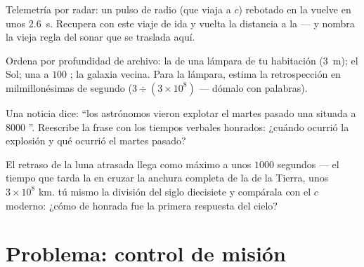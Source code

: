 \begin{exercise}[$\star\star$]\label{exo:g8:speed-of-light:9}
Telemetría por radar: un pulso de radio (que viaja a $c$) rebotado en
la  vuelve en unos \qty{2.6}{s}. Recupera con este viaje de ida
y vuelta la distancia a la  --- y nombra la vieja regla del
sonar que se traslada aquí.
\end{exercise}

\begin{exercise}[$\star\star$]\label{exo:g8:speed-of-light:10}
Ordena por profundidad de archivo: la  de una lámpara de tu
habitación (\qty{3}{m}); el Sol; una  a $100$
; la galaxia vecina. Para la lámpara, estima la
retrospección en milmillonésimas de segundo ($3 \div (3 \times
10^{8})$ --- dómalo con palabras).
\end{exercise}

\begin{exercise}[$\star\star$]\label{exo:g8:speed-of-light:11}
Una noticia dice: ``los astrónomos vieron explotar el martes pasado una
 situada a $8000$ ''. Reescribe la frase
con los tiempos verbales honrados: ¿cuándo ocurrió la explosión y qué
ocurrió el martes pasado?
\end{exercise}

\begin{exercise}[$\star\star\star$]\label{exo:g8:speed-of-light:12}
El retraso de la luna atrasada llega como máximo a unos $1000$ segundos
--- el tiempo que tarda la  en cruzar la anchura completa de la
 de la Tierra, unos $3 \times 10^{8}$ km.  tú mismo la
división del siglo diecisiete y compárala con el $c$ moderno: ¿cómo de
honrada fue la primera respuesta del cielo?
\end{exercise}

\section{Problema: control de misión}

